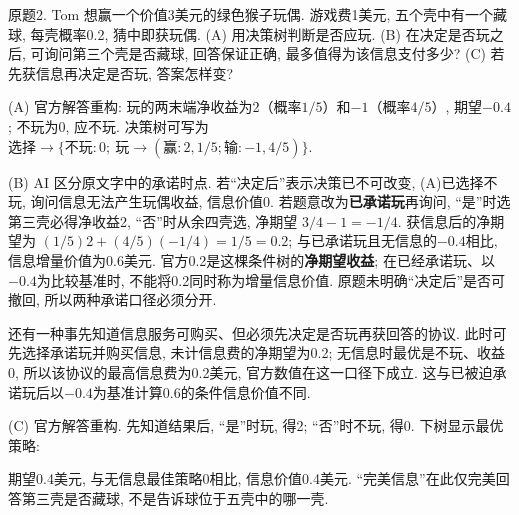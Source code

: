 \begin{exercise}\label{ass:15053-rec10-q2}
原题2. Tom 想赢一个价值3美元的绿色猴子玩偶. 游戏费1美元, 五个壳中有一个藏球, 每壳概率0.2, 猜中即获玩偶.
(A) 用决策树判断是否应玩. (B) 在决定是否玩之后, 可询问第三个壳是否藏球, 回答保证正确, 最多值得为该信息支付多少? (C) 若先获信息再决定是否玩, 答案怎样变?
\end{exercise}
\begin{solution}
(A) 官方解答重构: 玩的两末端净收益为2（概率$1/5$）和$-1$（概率$4/5$）, 期望$-0.4$; 不玩为0, 应不玩. 决策树可写为 $\text{选择}\to\{\text{不玩}:0;\ \text{玩}\to(\text{赢}:2,1/5;\text{输}:-1,4/5)\}$.

(B) AI 区分原文字中的承诺时点. 若“决定后”表示决策已不可改变, (A)已选择不玩, 询问信息无法产生玩偶收益, 信息价值0. 若题意改为\textbf{已承诺玩}再询问, “是”时选第三壳必得净收益2, “否”时从余四壳选, 净期望 $3/4-1=-1/4$. 获信息后的净期望为 $(1/5)2+(4/5)(-1/4)=1/5=0.2$; 与已承诺玩且无信息的$-0.4$相比, 信息增量价值为0.6美元. 官方0.2是这棵条件树的\textbf{净期望收益}; 在已经承诺玩、以$-0.4$为比较基准时, 不能将0.2同时称为增量信息价值. 原题未明确“决定后”是否可撤回, 所以两种承诺口径必须分开.

还有一种事先知道信息服务可购买、但必须先决定是否玩再获回答的协议. 此时可先选择承诺玩并购买信息, 未计信息费的净期望为0.2; 无信息时最优是不玩、收益0, 所以该协议的最高信息费为0.2美元, 官方数值在这一口径下成立. 这与已被迫承诺玩后以$-0.4$为基准计算0.6的条件信息价值不同.

(C) 官方解答重构. 先知道结果后, “是”时玩, 得2; “否”时不玩, 得0. 下树显示最优策略:
\begin{center}\end{center}
期望0.4美元, 与无信息最佳策略0相比, 信息价值0.4美元. “完美信息”在此仅完美回答第三壳是否藏球, 不是告诉球位于五壳中的哪一壳.
\end{solution}

